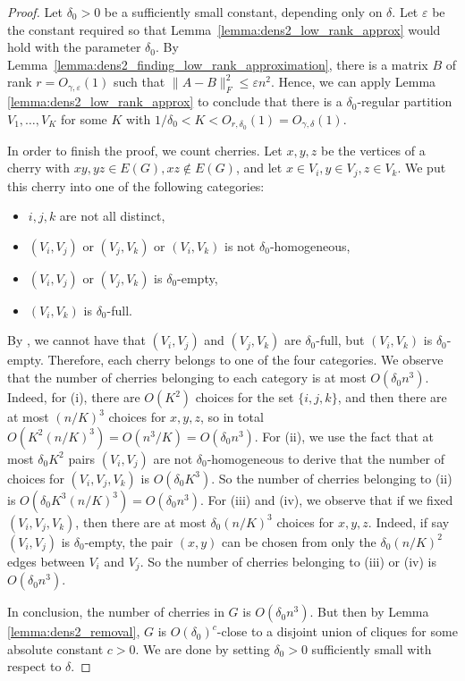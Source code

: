 \documentclass[11pt]{article}
\theoremstyle{plain}
\theoremstyle{definition}
\newcommand{\eps}{\varepsilon}
\begin{document}
\begin{proof}
    Let $\delta_0>0$ be a sufficiently small constant, depending only on $\delta$. Let $\eps$ be the constant required so that Lemma~\ref{lemma:dens2_low_rank_approx} would hold with the parameter $\delta_0$. 
    By Lemma~\ref{lemma:dens2_finding_low_rank_approximation}, there is a matrix $B$ of rank $r=O_{\gamma,\eps}(1)$ such that $\|A-B\|_F^2\leq \eps n^2$. Hence, we can apply Lemma \ref{lemma:dens2_low_rank_approx} to conclude that there is a $\delta_0$-regular partition $V_1,\dots,V_K$ for some $K$ with $1/\delta_0< K <O_{r,\delta_0}(1)=O_{\gamma,\delta}(1)$.

    In order to finish the proof, we count cherries. Let $x,y,z$ be the vertices of a cherry with $xy,yz\in E(G), xz\not\in E(G)$, and let $x\in V_i, y\in V_j, z\in V_{k}$. We put this cherry into one of the following categories:
    \begin{itemize}
        \item[(i)] $i,j,k$ are not all distinct,
        \item[(ii)] $(V_i,V_j)$ or $(V_j,V_k)$ or $(V_i,V_k)$ is not $\delta_0$-homogeneous,
        \item[(iii)] $(V_i,V_j)$ or $(V_j,V_k)$ is $\delta_0$-empty,
        \item[(iv)]  $(V_i,V_k)$ is $\delta_0$-full.
    \end{itemize}
    By , we cannot have that $(V_i,V_j)$ and $(V_j,V_k)$ are $\delta_0$-full, but $(V_i,V_k)$ is $\delta_0$-empty. Therefore, each cherry belongs to one of the four categories. We observe that the number of cherries belonging to each category is at most $O(\delta_0 n^3)$. 
    Indeed, for (i), there are $O(K^2)$ choices for the set $\{i,j,k\}$, and then there are at most $(n/K)^3$ choices for $x,y,z$, so in total $O(K^2 (n/K)^3)=O(n^3/K)=O(\delta_0 n^3)$.
    For (ii), we use the fact that at most $\delta_0 K^2$ pairs $(V_i,V_j)$ are not $\delta_0$-homogeneous to derive that the number of choices for $(V_i,V_j,V_k)$ is $O(\delta_0 K^3)$. So the number of cherries belonging to (ii) is $O(\delta_0 K^3(n/K)^3)=O(\delta_0 n^3)$.
    For (iii) and (iv), we observe that if we fixed $(V_i,V_j,V_k)$, then there are at most $\delta_0 (n/K)^3$ choices for $x,y,z$. Indeed, if say $(V_i,V_j)$ is $\delta_0$-empty, the pair $(x,y)$ can be chosen from only the $\delta_0 (n/K)^2$ edges between $V_i$ and $V_j$. So the number of cherries belonging to (iii) or (iv) is $O(\delta_0n^3)$.

    In conclusion, the number of cherries in $G$ is $O(\delta_0 n^3)$. But then by Lemma \ref{lemma:dens2_removal}, $G$ is $O(\delta_0)^c$-close to a disjoint union of cliques for some absolute constant $c>0$. We are done by setting $\delta_0>0$ sufficiently small with respect to $\delta$.
\end{proof}
\end{document}

